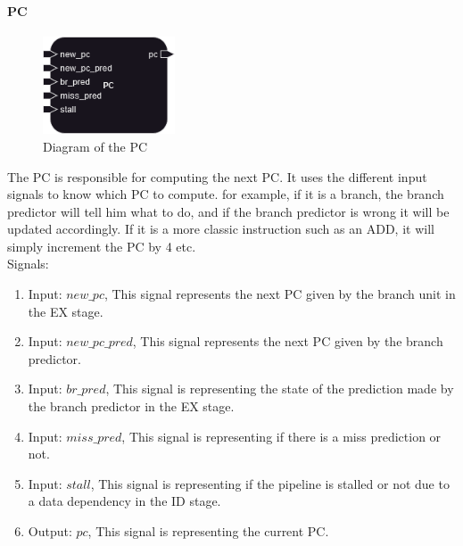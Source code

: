 \paragraph{PC}

\begin{figure}[H]
    \centering
    \includegraphics[width=0.35\textwidth]{design/pipelined/fetch/images/pc.png}
    \caption{Diagram of the PC}
    \label{fig:PC}
\end{figure}

The PC is responsible for computing the next PC. It uses the different input signals to know which PC to compute.
for example, if it is a branch, the branch predictor will tell him what to do, and if the branch predictor is wrong
it will be updated accordingly. If it is a more classic instruction such as an ADD, it will simply increment the PC by 4
etc. \\

Signals:
\begin{enumerate}[label={\textbullet}]
    \item Input: $new\_pc$, This signal represents the next PC given by the branch unit in the EX stage.
    \item Input: $new\_pc\_pred$, This signal represents the next PC given by the branch predictor.
    \item Input: $br\_pred$, This signal is representing the state of the prediction made by the branch predictor in the EX stage.
    \item Input: $miss\_pred$, This signal is representing if there is a miss prediction or not.
    \item Input: $stall$, This signal is representing if the pipeline is stalled or not due to a data dependency in the ID stage.
    \item Output: $pc$, This signal is representing the current PC\@.
\end{enumerate}

